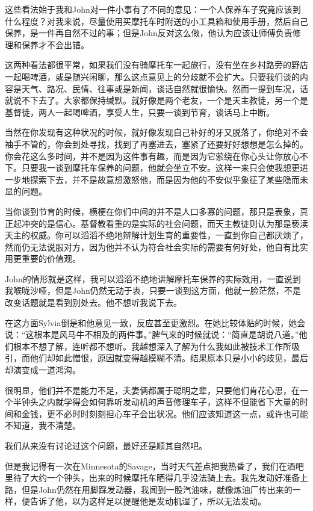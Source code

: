 \documentclass[UTF8]{article}
\begin{document}
\par 这些看法始于我和John对一件小事有了不同的意见：一个人保养车子究竟应该到什么程度？对我来说，尽量使用买摩托车时附送的小工具箱和使用手册，然后自己保养，是一件再自然不过的事；但是John反对这么做，他认为应该让师傅负责修理和保养才不会出错。
\par 这两种看法都很平常，如果我们没有骑摩托车一起旅行，没有坐在乡村路旁的野店一起喝啤酒，或是随兴闲聊，那么这点意见上的分歧就不会扩大。只要我们谈的内容是天气、路况、民情、往事或是新闻，谈话自然就很愉快。然而一提到车况，话就说不下去了。大家都保持缄默。就好像是两个老友，一个是天主教徒，另一个是基督徒，两人一起喝啤酒，享受人生，只要一谈到节育，谈话马上中断。
\par 当然在你发现有这种状况的时候，就好像发现自己补好的牙又脱落了，你绝对不会袖手不管的，你会到处寻找，找到了再塞进去，塞紧了还要好好想想是怎么掉的。你会花这么多时间，并不是因为这件事有趣，而是因为它萦绕在你心头让你放心不下。只要我一谈到摩托车保养的问题，他就会坐立不安。这样一来只会使我想更进一步地探索下去，并不是故意想激怒他，而是因为他的不安似乎象征了某些隐而未显的问题。
\par 当你谈到节育的时候，横梗在你们中间的并不是人口多寡的问题，那只是表象，真正起冲突的是信心。基督教看重的是实际的社会问题，而天主教徒则认为那是亵渎天主的权威。你可以滔滔不绝地辩解计划生育的重要性，一直到你自己都厌烦了，然而仍无法说服对方，因为他并不认为符合社会实际的需要有何好处，他自有比实用更重要的价值观。
\par John的情形就是这样，我可以滔滔不绝地讲解摩托车保养的实际效用，一直说到我喉咙沙哑，但是John仍然无动于衷，只要一谈到这方面，他就一脸茫然，不是改变话题就是看到别处去。他不想听我说下去。
\par 在这方面Sylvia倒是和他意见一致，反应甚至更激烈。在她比较体贴的时候，她会说：“这根本是风马牛不相及的两件事。”脾气来的时候就说：“简直是胡说八道。”他们根本不想了解，连听都不想听。我越想深入了解为什么我如此被技术工作所吸引，而他们却如此憎恨，原因就变得越模糊不清。结果原本只是小小的歧见，最后却演变成一道鸿沟。
\par 很明显，他们并不是能力不足，夫妻俩都属于聪明之辈，只要他们肯花心思，在一个半钟头之内就学得会如何靠听发动机的声音修理车子，这样不但能省下大量的时间和金钱，更不必时时刻刻担心车子会出状况。他们应该知道这一点，或许也可能不知道，我不清楚。
\par 我们从来没有讨论过这个问题，最好还是顺其自然吧。
\par 但是我记得有一次在Minnesota的Savage，当时天气差点把我热昏了，我们在酒吧里待了大约一个钟头，出来的时候摩托车晒得几乎没法骑上去。我先发动好准备上路，但是John仍然在用脚踩发动器，我闻到一股汽油味，就像炼油厂传出来的一样，便告诉了他，以为这样足以提醒他是发动机湿了，所以无法发动。
\end{document}
